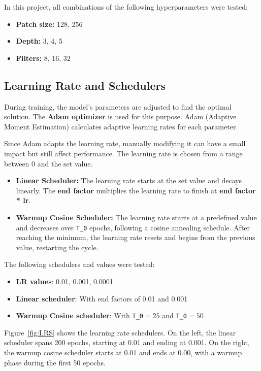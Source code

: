 In this project, all combinations of the following hyperparameters were tested:

\begin{itemize}
    \item \textbf{Patch size:} 128, 256
    \item \textbf{Depth:} 3, 4, 5
    \item \textbf{Filters:} 8, 16, 32
\end{itemize}

\subsection{Learning Rate and Schedulers}\label{sec:1.2.9}

During training, the model's parameters are adjusted to find the optimal solution. The \textbf{Adam optimizer} \cite{kingma2017adammethodstochasticoptimization} is used for this purpose. Adam (Adaptive Moment Estimation) calculates adaptive learning rates for each parameter.

Since Adam adapts the learning rate, manually modifying it can have a small impact but still affect performance. The learning rate is chosen from a range between 0 and the set value.

\begin{itemize}
    \item \textbf{Linear Scheduler:} The learning rate starts at the set value and decays linearly. The \textbf{end factor} multiplies the learning rate to finish at \textbf{end factor * lr}.
    \item \textbf{Warmup Cosine Scheduler:} The learning rate starts at a predefined value and decreases over \texttt{T\_0} epochs, following a cosine annealing schedule. After reaching the minimum, the learning rate resets and begins from the previous value, restarting the cycle.
\end{itemize}

The following schedulers and values were tested:
\begin{itemize}
    \item \textbf{LR values}: 0.01, 0.001, 0.0001
    \item \textbf{Linear scheduler}: With end factors of 0.01 and 0.001
    \item \textbf{Warmup Cosine scheduler}: With \texttt{T\_0}$= 25$ and \texttt{T\_0}$= 50$
\end{itemize}

Figure~\ref{fig:LRS} shows the learning rate schedulers. On the left, the linear scheduler spans 200 epochs, starting at 0.01 and ending at 0.001. On the right, the warmup cosine scheduler starts at 0.01 and ends at 0.00, with a warmup phase during the first 50 epochs.

